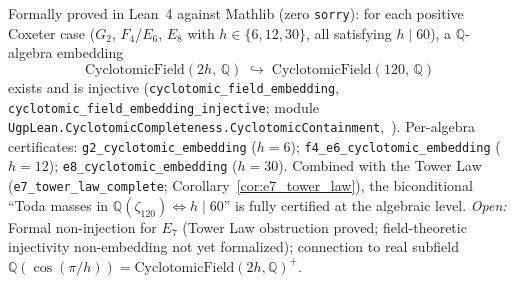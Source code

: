 \documentclass[11pt]{article}
\theoremstyle{remark}
\newcommand{\zetaN}[1]{\zeta_{#1}}
\begin{document}
\begin{tcolorbox}[colback=blue!3!white, colframe=blue!50!black,
  title={Lean 4 Track C: Field-Theoretic Embedding Certificates (zero \texttt{sorry})}]
\small
Formally proved in Lean~4 against Mathlib (zero \texttt{sorry}):
for each positive Coxeter case ($G_2$, $F_4$/$E_6$, $E_8$ with $h \in \{6,12,30\}$,
all satisfying $h \mid 60$), a $\mathbb{Q}$-algebra embedding
\[
  \mathrm{CyclotomicField}(2h,\,\mathbb{Q})
  \;\hookrightarrow\;
  \mathrm{CyclotomicField}(120,\,\mathbb{Q})
\]
exists and is injective
(\texttt{cyclotomic\_field\_embedding}, \texttt{cyclotomic\_field\_embedding\_injective};
module \texttt{UgpLean.CyclotomicCompleteness.CyclotomicContainment},~\cite{ugp-lean}).
Per-algebra certificates: \texttt{g2\_cyclotomic\_embedding} ($h{=}6$);
\texttt{f4\_e6\_cyclotomic\_embedding} ($h{=}12$);
\texttt{e8\_cyclotomic\_embedding} ($h{=}30$).
Combined with the Tower Law (\texttt{e7\_tower\_law\_complete};
Corollary~\ref{cor:e7_tower_law}), the biconditional
``Toda masses in $\mathbb{Q}(\zetaN{120}) \Leftrightarrow h \mid 60$''
is fully certified at the algebraic level.
\textit{Open:} Formal non-injection for $E_7$ (Tower Law obstruction proved;
field-theoretic injectivity non-embedding not yet formalized); connection to
real subfield $\mathbb{Q}(\cos(\pi/h)) = \mathrm{CyclotomicField}(2h,\mathbb{Q})^+$.
\end{tcolorbox}
\end{document}
